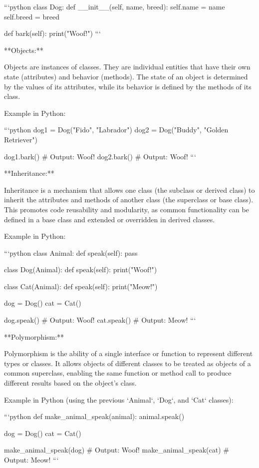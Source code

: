 \documentclass{article}
\begin{document}
```python
class Dog:
    def __init__(self, name, breed):
        self.name = name
        self.breed = breed

    def bark(self):
        print("Woof!")
```

**Objects:**

Objects are instances of classes. They are individual entities that have their own state (attributes) and behavior (methods). The state of an object is determined by the values of its attributes, while its behavior is defined by the methods of its class.

Example in Python:

```python
dog1 = Dog("Fido", "Labrador")
dog2 = Dog("Buddy", "Golden Retriever")

dog1.bark()  # Output: Woof!
dog2.bark()  # Output: Woof!
```

**Inheritance:**

Inheritance is a mechanism that allows one class (the subclass or derived class) to inherit the attributes and methods of another class (the superclass or base class). This promotes code reusability and modularity, as common functionality can be defined in a base class and extended or overridden in derived classes.

Example in Python:

```python
class Animal:
    def speak(self):
        pass

class Dog(Animal):
    def speak(self):
        print("Woof!")

class Cat(Animal):
    def speak(self):
        print("Meow!")

dog = Dog()
cat = Cat()

dog.speak()  # Output: Woof!
cat.speak()  # Output: Meow!
```

**Polymorphism:**

Polymorphism is the ability of a single interface or function to represent different types or classes. It allows objects of different classes to be treated as objects of a common superclass, enabling the same function or method call to produce different results based on the object's class.

Example in Python (using the previous `Animal`, `Dog`, and `Cat` classes):

```python
def make_animal_speak(animal):
    animal.speak()

dog = Dog()
cat = Cat()

make_animal_speak(dog)  # Output: Woof!
make_animal_speak(cat)  # Output: Meow!
```
\end{document}
